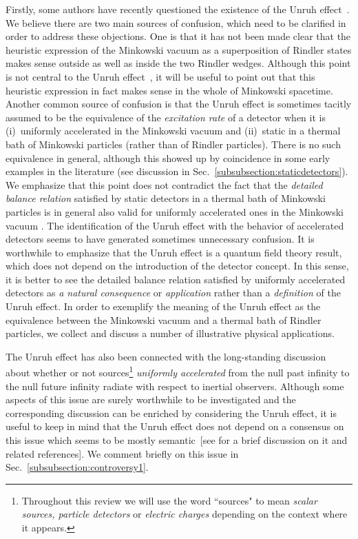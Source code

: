 \documentclass[12pt,nofootinbib,floatfix,aps,prd,showpacs,amsmath,amssymb,eqsecnum]{revtex4-2}
\let\cite\citep
\begin{document}
Firstly, some authors have recently questioned the existence of the
Unruh effect~\cite{Belinskiietal02, Belinskiietal04}. 
We believe there are two main sources of confusion,
which need to be clarified in order to address these objections.
One is that it has not been 
made clear that the heuristic expression of the Minkowski
vacuum as a superposition of Rindler states makes sense outside as well
as inside the two Rindler wedges.
Although this point is not central to the Unruh
effect~\cite{rebuttal}, it will be useful to point out that this
heuristic expression in fact makes sense in the whole of Minkowski
spacetime. 
Another common source of confusion is that the 
Unruh effect is sometimes tacitly assumed to be the equivalence 
of the {\em excitation rate} of a detector when it is 
(i)~uniformly accelerated in the Minkowski vacuum and 
(ii)~static in a thermal bath of Minkowski particles 
(rather than of Rindler particles). There is no such equivalence 
in general, although this showed up by coincidence in some early 
examples in the literature 
(see discussion in Sec.~\ref{subsubsection:staticdetectors}). 
We emphasize that this point does not contradict 
the fact that the {\em detailed balance relation} 
satisfied by static detectors in a thermal bath of Minkowski particles 
is in general also valid for uniformly accelerated ones in the Minkowski 
vacuum \cite{Unruh76}. The identification of 
the Unruh effect with the behavior of accelerated detectors 
seems to have generated sometimes unnecessary confusion. It is 
worthwhile to emphasize that the Unruh effect is a quantum 
field theory result, which does not depend on the introduction 
of the detector concept. In this sense, it is better to see the 
detailed balance relation satisfied by uniformly accelerated 
detectors as {\em a natural consequence} or {\em application}
rather than a {\em definition} of the Unruh effect. In order to 
exemplify the meaning of the Unruh effect  as the equivalence 
between the Minkowski vacuum and a thermal bath of Rindler 
particles, we collect and discuss a number of illustrative 
physical applications.

The Unruh effect has also been connected with the long-standing 
discussion about whether or not 
sources\footnote{Throughout this review we will use the word ``sources" 
to mean {\em scalar sources, particle detectors} or 
{\em electric charges} depending on the context where it appears.} 
{\em uniformly accelerated} 
from the null past infinity to the null future infinity radiate 
with respect to inertial observers. Although some aspects of this 
issue are surely worthwhile to be investigated and the corresponding 
discussion can be enriched by considering the Unruh 
effect, it is useful to keep in mind that the Unruh effect 
does not depend on a consensus on this issue which seems to be mostly 
semantic~[see \textcite{Fulling05} for a brief discussion on it 
and related references]. We comment briefly on this issue in 
Sec.~\ref{subsubsection:controversy1}. 
\end{document}
